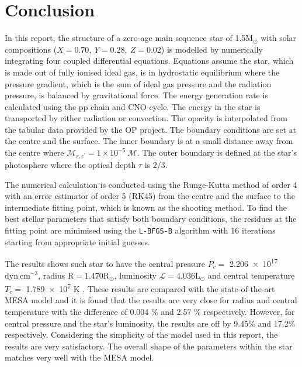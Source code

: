 \documentclass[twocolumn]{aastex631}
\begin{document}
\section{Conclusion}
\label{sec:conclusion}
In this report, the structure of a zero-age main sequence star of 1.5M$_\odot$ with solar compositions ($X = 0.70, ~Y = 0.28, ~Z = 0.02$) is modelled by numerically integrating four coupled differential equations. Equations assume the star, which is made out of fully ionised ideal gas, is in hydrostatic equilibrium where the pressure gradient, which is the sum of ideal gas pressure and the radiation pressure, is balanced by gravitational force. The energy generation rate is calculated using the pp chain and CNO cycle. The energy in the star is transported by either radiation or convection. The opacity is interpolated from the tabular data provided by the OP project. The boundary conditions are set at the centre and the surface. The inner boundary is at a small distance away from the centre where $\mathcal{M}_{r, {c^\prime}} = 1 \times 10^{-5} ~ \mathcal{M}$. The outer boundary is defined at the star's photosphere where the optical depth $\tau$ is 2/3.

The numerical calculation is conducted using the Runge-Kutta method of order 4 with an error estimator of order 5 (RK45) from the centre and the surface to the intermediate fitting point, which is known as the shooting method. To find the best stellar parameters that satisfy both boundary conditions, the residues at the fitting point are minimised using the \verb|L-BFGS-B| algorithm with 16 iterations starting from appropriate initial guesses.

The results shows such star to have the central pressure $P_c = $ \num{2.206e17} $\mathrm{dyn ~ cm^{-3}}$, radius $\mathrm{R} = 1.470 \mathrm{R}_\odot$, luminosity $\mathcal{L} = 4.036  \mathrm{L}_\odot$ and central temperature $T_c = $ \num{1.789e7} $\mathrm{K}$ . These results are compared with the state-of-the-art MESA model and it is found that the results are very close for radius and central temperature with the difference of 0.004 \% and 2.57 \% respectively. However, for central pressure and the star's luminosity, the results are off by 9.45\% and 17.2\% respectively. Considering the simplicity of the model used in this report, the results are very satisfactory. The overall shape of the parameters within the star matches very well with the MESA model.

{}

\nocite{*}
\end{document}
